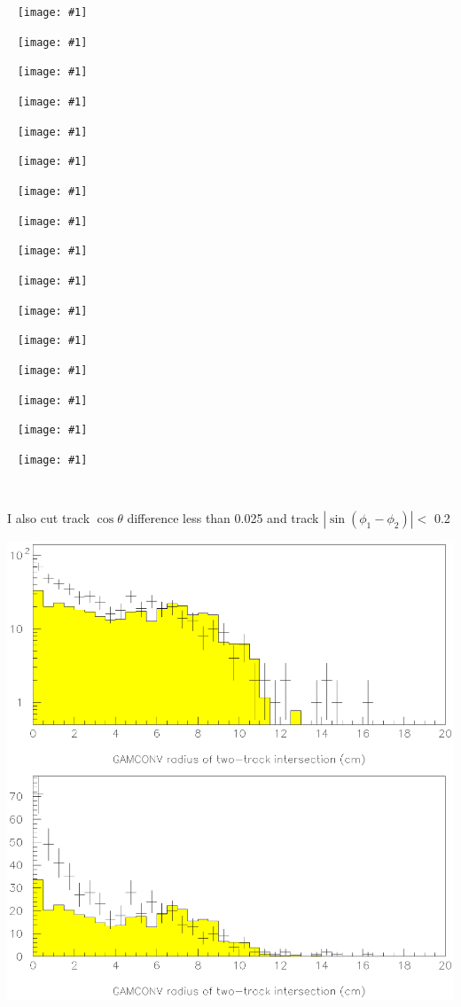 \documentclass{article}
\newcommand{\doit}[1]{\mbox{ } \vfill \texttt{[image: \#1]} \vfill \mbox{ } \pagebreak}
\begin{document}


\doit{convstudy_gg_1}

\doit{convstudy_gg_2}

\doit{convstudy_gg_3}

\doit{convstudy_gg_4}

\doit{convstudy_gg_5}

\doit{convstudy_gg_6}

\doit{convstudy_gg_7}

\doit{convstudy_gg_8}

\doit{convstudy_gg_9}

\doit{convstudy_gg_9.5.eps}

\doit{convstudy_gg_10}

\doit{convstudy_gg_11}

\doit{convstudy_gg_12.5.eps}

\doit{convstudy_gg_12}

\doit{convstudy_gg_13}

\doit{convstudy_gg_14}

\mbox{ }

\vfill

\begin{center} \huge I also cut track $\cos\theta$ difference less than 0.025 and track $|\sin(\phi_1-\phi_2)| <$ 0.2 \end{center}

\vfill

\includegraphics[width=\linewidth]{convstudy_gg_9.01.eps}
\end{document}

